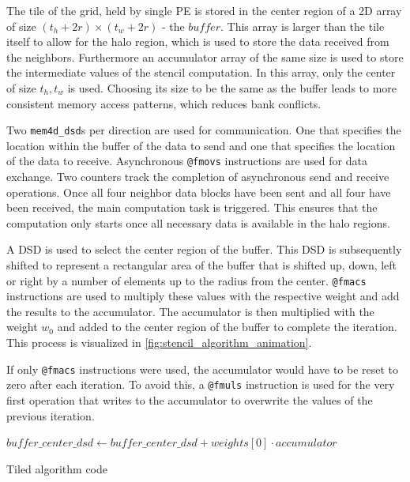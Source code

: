 The tile of the grid, held by single PE is stored in the center region of a 2D array of size $(t_h+2r)\times (t_w+2r)$ - the $buffer$. This array is larger than the tile itself to allow for the halo region, which is used to store the data received from the neighbors. Furthermore an accumulator array of the same size is used to store the intermediate values of the stencil computation. In this array, only the center of size $t_h, t_w$ is used. Choosing its size to be the same as the buffer leads to more consistent memory access patterns, which reduces bank conflicts.

Two \texttt{mem4d\_dsd}s per direction are used for communication. One that specifies the location within the buffer of the data to send and one that specifies the location of the data to receive.
Asynchronous \texttt{@fmovs} instructions are used for data exchange. Two counters track the completion of asynchronous send and receive operations. Once all four neighbor data blocks have been sent and all four have been received, the main computation task is triggered. This ensures that the computation only starts once all necessary data is available in the halo regions.

A DSD is used to select the center region of the buffer. This DSD is subsequently shifted to represent a rectangular area of the buffer that is shifted up, down, left or right by a number of elements up to the radius from the center. \texttt{@fmacs} instructions are used to multiply these values with the respective weight and add the results to the accumulator. The accumulator is then multiplied with the weight $w_0$ and added to the center region of the buffer to complete the iteration. This process is visualized in \autoref{fig:stencil_algorithm_animation}.

If only \texttt{@fmacs} instructions were used, the accumulator would have to be reset to zero after each iteration. To avoid this, a \texttt{@fmuls} instruction is used for the very first operation that writes to the accumulator to overwrite the values of the previous iteration.

\begin{algorithm}[tbh]
    \SetAlgoLined
    $buffer\_center\_dsd \gets buffer\_center\_dsd + weights[0] \cdot accumulator$\;
    \caption{Tiled algorithm code}\label{alg:tiled_algorithm}
\end{algorithm}

